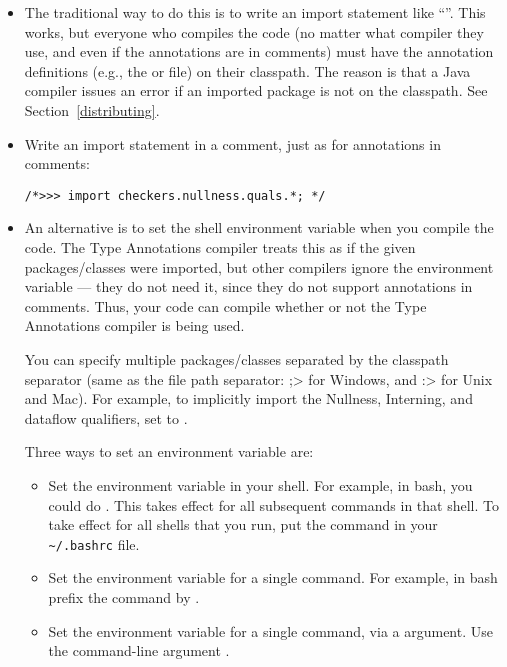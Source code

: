 \begin{itemize}
\item
The traditional way to do this is to write an import statement like
``''.  This works, but everyone who
compiles the code (no matter what compiler they use, and even if the
annotations are in comments) must have the annotation definitions (e.g.,
the  or  file) on their
classpath.  The reason is that a Java compiler issues an error if an
imported package is not on the classpath.  See Section~\ref{distributing}.

\item
Write an import statement in a comment, just as for annotations in comments:
\begin{Verbatim}
/*>>> import checkers.nullness.quals.*; */
\end{Verbatim}

\item
An alternative is to set the shell environment variable
 when you compile the code.
The Type Annotations compiler treats this as if the given packages/classes were
imported, but other compilers
ignore the
 environment variable --- they do not need it, since
they do not support annotations in comments.  Thus, your code can compile
whether or not the Type Annotations compiler is being used.

You can specify multiple packages/classes separated by the classpath separator
(same as the file path separator:  \<;> for Windows, and \<:> for Unix and
Mac).  For example, to implicitly import the Nullness, Interning, and dataflow
qualifiers, set  to
.

Three ways to set an environment variable are:
\begin{itemize}
\item
  Set the environment variable in your shell.  For example, in bash, you
  could do .
  This takes effect for all subsequent commands in that shell.  To take
  effect for all shells that you run, put the command in your
  \verb|~/.bashrc| file.
\item
  Set the environment variable for a single command.  For example, in bash
  prefix the  command by
  .
\item
  Set the environment variable for a single command, via a 
  argument.  Use the  command-line argument
  .
\end{itemize}


\end{itemize}
